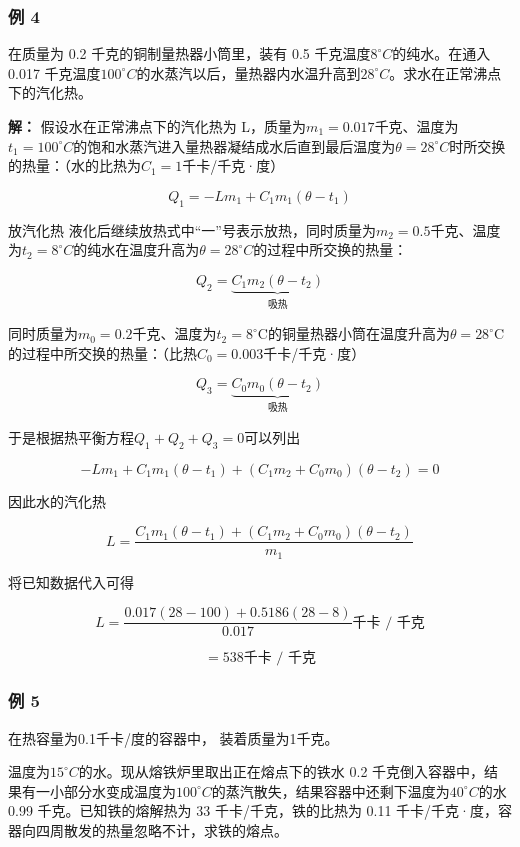 \subsubsection{例 4}\label{ux4f8b-4-5}

在质量为 0.2 千克的铜制量热器小筒里，装有 0.5
千克温度\(8^{\circ}C\)的纯水。在通入 0.017
千克温度\(100^{\circ}C\)的水蒸汽以后，量热器内水温升高到\(28^{\circ}C\)。求水在正常沸点下的汽化热。

\textbf{解：} 假设水在正常沸点下的汽化热为
L，质量为\(m_{1}=0.017\)千克、温度为\(t_{1}=100^{\circ}C\)的饱和水蒸汽进入量热器凝结成水后直到最后温度为\(\theta=28^{\circ}C\)时所交换的热量：（水的比热为\(C_{1}=1\)千卡/千克·度）

\[
Q _ {1} = - L m _ {1} + C _ {1} m _ {1} (\theta - t _ {1})
\]

放汽化热
液化后继续放热式中``一''号表示放热，同时质量为\(m_{2} = 0.5\)千克、温度为\(t_2 = 8^{\circ}C\)的纯水在温度升高为\(\theta = 28^{\circ}C\)的过程中所交换的热量：

\[
Q_2=\underbrace{C_1m_2(\theta-t_2)}_{\text{吸热}}
\]

同时质量为\(m_0 = 0.2\)千克、温度为\(t_2 = 8^\circ \mathrm{C}\)的铜量热器小筒在温度升高为\(\theta = 28^{\circ}\mathrm{C}\)的过程中所交换的热量：（比热\(C_0 = 0.003\)千卡/千克·度）

\[
Q_3=\underbrace{C_0m_0(\theta-t_2)}_{\text{吸热}}
\]

于是根据热平衡方程\(Q_{1} + Q_{2} + Q_{3} = 0\)可以列出

\[
- L m _ {1} + C _ {1} m _ {1} (\theta - t _ {1}) + (C _ {1} m _ {2} + C _ {0} m _ {0}) (\theta - t _ {2}) = 0
\]

因此水的汽化热

\[
L = \frac {C _ {1} m _ {1} (\theta - t _ {1}) + (C _ {1} m _ {2} + C _ {0} m _ {0}) (\theta - t _ {2})}{m _ {1}}
\]

将已知数据代入可得

\[
L = \frac {0.017 (28 - 100) + 0.5186 (28 - 8)}{0.017} \text{千卡 / 千克}
\]

\[
= 538 \text{千卡 / 千克}
\]

\subsubsection{例 5}\label{ux4f8b-5-4}

在热容量为0.1千卡/度的容器中， 装着质量为1千克。

温度为\(15^{\circ}C\)的水。现从熔铁炉里取出正在熔点下的铁水 0.2
千克倒入容器中，结果有一小部分水变成温度为\(100^{\circ}C\)的蒸汽散失，结果容器中还剩下温度为\(40^{\circ}C\)的水
0.99 千克。已知铁的熔解热为 33 千卡/千克，铁的比热为 0.11
千卡/千克·度，容器向四周散发的热量忽略不计，求铁的熔点。

